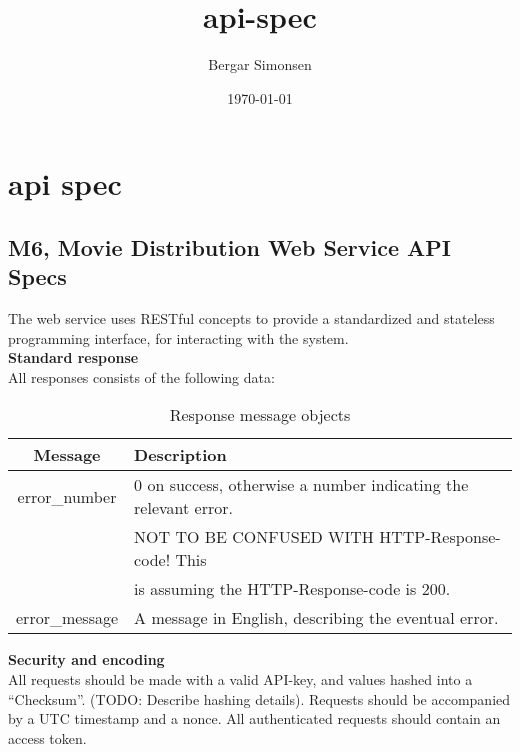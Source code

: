 \documentclass[11pt]{article}
\title{api-spec}
\author{Bergar Simonsen}
\date{\today}
\begin{document}
\maketitle

\setcounter{tocdepth}{3}
\tableofcontents
\vspace*{1cm}
\section{api spec}
\subsection{M6, Movie Distribution Web Service API Specs}

The web service uses RESTful concepts to provide a standardized and stateless programming interface, for interacting with the system. \\

\textbf{Standard response} \\
All responses consists of the following data:

\begin{table}[H]
\caption{Response message objects}
\begin{center}
\begin{tabular}{|c|l|}
\hline
 Message                     &  Description                                               \\
\hline
 error\_number   &  0 on success, otherwise a number indicating the relevant error.  \\
                             &  NOT TO BE CONFUSED WITH HTTP-Response-code! This   \\
                             &  is assuming the HTTP-Response-code is 200.                \\
\hline
 error\_message  &  A message in English, describing the eventual error.      \\
\hline
\end{tabular}
\end{center}
\end{table}



\textbf{Security and encoding} \\
All requests should be made with a valid API-key, and values hashed into a “Checksum”. (TODO: Describe hashing details). Requests should be accompanied by a UTC timestamp and a nonce. All authenticated requests should contain an access token.
\end{document}
